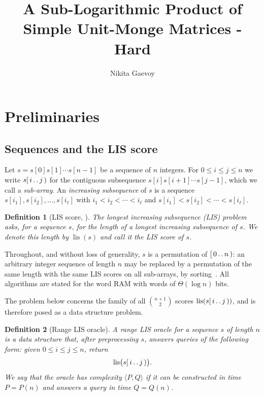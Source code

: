 \documentclass[10pt]{article}
\title{A Sub-Logarithmic Product of Simple Unit-Monge Matrices - Hard}
\author{Nikita Gaevoy}
\date{}
\newtheorem{definition}{Definition}
\newcommand{\lis}{\operatorname{lis}}
\begin{document}
\maketitle

\section{Preliminaries}

\subsection{Sequences and the LIS score}

Let $s=s[0]s[1]\cdots s[n-1]$ be a sequence of $n$ integers. For
$0\le i\le j\le n$ we write $s[\,i\mathinner{.\,.}j\,)$ for the contiguous
subsequence $s[i]s[i+1]\cdots s[j-1]$, which we call a \emph{sub-array}. An
\emph{increasing subsequence} of $s$ is a sequence
$s[i_1],s[i_2],\ldots,s[i_\ell]$ with $i_1<i_2<\cdots<i_\ell$ and
$s[i_1]<s[i_2]<\cdots<s[i_\ell]$.

\begin{definition}[LIS score, {\cite[Definition 8.1]{TiskinArXiv}}]\label{def:lis}
The \emph{longest increasing subsequence} (LIS) problem asks, for a sequence
$s$, for the length of a longest increasing subsequence of $s$. We denote this
length by $\lis(s)$ and call it the \emph{LIS score} of $s$.
\end{definition}

Throughout, and without loss of generality, $s$ is a permutation of
$[\,0\mathinner{.\,.}n\,)$: an arbitrary integer sequence of length $n$ may be replaced by
a permutation of the same length with the same LIS scores on all sub-arrays, by
sorting~\cite[Section 5]{GGK25}. All algorithms are stated for the word RAM
with words of $\Theta(\log n)$ bits.

The problem below concerns the family of all $\binom{n+1}{2}$ scores
$\lis(s[\,i\mathinner{.\,.}j\,))$, and is therefore posed as a data structure problem.

\begin{definition}[Range LIS oracle]\label{def:oracle}
A \emph{range LIS oracle} for a sequence $s$ of length $n$ is a data structure
that, after preprocessing $s$, answers queries of the following form: given
$0\le i\le j\le n$, return
\[
\lis\bigl(s[\,i\mathinner{.\,.}j\,)\bigr).
\]
We say that the oracle has \emph{complexity} $\langle P,Q\rangle$ if it can be
constructed in time $P=P(n)$ and answers a query in time $Q=Q(n)$.
\end{definition}
\end{document}
